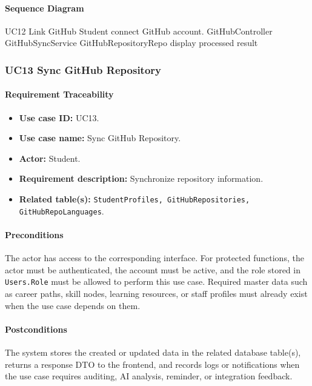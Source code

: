 \paragraph{Sequence Diagram}

\SequenceDiagram
{UC12 Link GitHub}
{Student}
{connect GitHub account.}
{GitHubController}
{GitHubSyncService}
{GitHubRepositoryRepo}
{display processed result}

\subsubsection{UC13 Sync GitHub Repository}

\paragraph{Requirement Traceability}

\begin{itemize}
    \item \textbf{Use case ID:} UC13.
    \item \textbf{Use case name:} Sync GitHub Repository.
    \item \textbf{Actor:} Student.
    \item \textbf{Requirement description:} Synchronize repository information.
    \item \textbf{Related table(s):} \texttt{StudentProfiles, GitHubRepositories, GitHubRepoLanguages}.
\end{itemize}

\paragraph{Preconditions}

The actor has access to the corresponding interface. For protected functions, the actor must be authenticated, the account must be active, and the role stored in \texttt{Users.Role} must be allowed to perform this use case. Required master data such as career paths, skill nodes, learning resources, or staff profiles must already exist when the use case depends on them.

\paragraph{Postconditions}

The system stores the created or updated data in the related database table(s), returns a response DTO to the frontend, and records logs or notifications when the use case requires auditing, AI analysis, reminder, or integration feedback.

